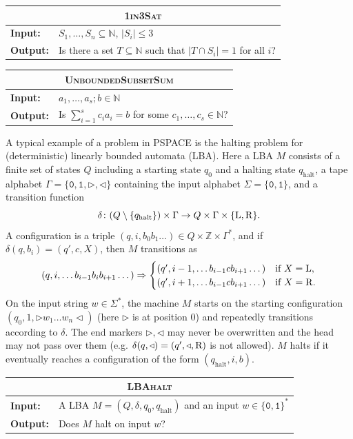 \documentclass[12pt]{article}
\newcommand{\NN}{\mathbb{N}}
\newcommand{\ZZ}{\mathbb{Z}}
\newcommand{\NULL}{\texttt{0}}
\newcommand{\EINS}{\texttt{1}}
\newcommand\problemBox[4][0.96\textwidth]{
\begin{tabularx}{#1}{lX}
\toprule
\multicolumn{2}{c}{#2} \\ \midrule
\textbf{Input:}    & #3  \\
\textbf{Output:} & #4  \\ \bottomrule
\end{tabularx}
}
\newcommand{\problemText}[1]{\textsc{#1}\xspace}
\newcommand{\OneInThreeSAT}{\problemText{1in3Sat}}
\newcommand{\SubsetSum}{\problemText{UnboundedSubsetSum}}
\newcommand{\LBAhalt}{\problemText{LBAhalt}}
\newcommand{\cclass}[1]{\textsf{\textup{#1}}\xspace}
\newcommand{\PSPACE}{\cclass{PSPACE}}
\begin{document}
  \begin{table}[H]
    \centering
    \problemBox[0.48\textwidth]{\OneInThreeSAT}
    {$S_1,\dots,S_n \subseteq \NN$, $|S_i| \leq 3$}
    {Is there a set $T \subseteq \NN$ such that $|T \cap S_i| = 1$ for all $i$?} 
    \problemBox[0.48\textwidth]{\SubsetSum}
    {$a_1,\dots,a_s;b \in \NN$}
    {Is $\sum_{i = 1}^s c_ia_i = b$ for some $c_1,\dots,c_s \in \NN$?}
  \end{table}

A typical example of a problem in \PSPACE is the halting problem for (deterministic) linearly bounded automata (LBA). Here a LBA $M$ consists of a finite set of states $Q$ including a starting state $q_0$ and a halting state $q_{\text{halt}}$, a tape alphabet $\Gamma = \{\NULL,\EINS,{\triangleright},{\triangleleft}\}$ containing the input alphabet $\Sigma = \{\NULL,\EINS\}$, and a transition function
\[
\delta \colon (Q\setminus\{q_{\text{halt}}\}) \times \Gamma \to Q \times \Gamma \times \{{\rm L},{\rm R}\}.
\]
A configuration is a triple $(q,i,b_0b_1\dots) \in Q \times \ZZ \times \Gamma^*$, and if $\delta(q,b_i) = (q',c,X)$, then $M$ transitions as
\[
(q,i,\dots b_{i-1}b_ib_{i+1} \dots ) \Rightarrow \begin{cases}
  (q',i-1, \dots b_{i-1}c b_{i+1} \dots) & \text{if }X = {\rm L},\\
  (q',i+1, \dots b_{i-1}c b_{i+1} \dots) & \text{if }X = {\rm R}. 
\end{cases} 
\]
On the input string $w \in \Sigma^*$, the machine $M$ starts on the starting configuration $(q_0,1,{\triangleright}w_1\dots w_n {\triangleleft})$ (here $\triangleright$ is at position $0$) and repeatedly transitions according to $\delta$. The end markers $\triangleright, \triangleleft$ may never be overwritten and the head may not pass over them (e.g. $\delta(q,{\triangleleft}) = (q',{\triangleleft},{\rm R})$ is not allowed). $M$ halts if it eventually reaches a configuration of the form $(q_{\text{halt}},i,b)$.

\begin{table}[H]
  \centering
  \problemBox[\textwidth]{\LBAhalt}
  {A LBA $M = (Q,\delta,q_0,q_{\text{halt}})$ and an input $w \in \{\NULL,\EINS\}^*$}
  {Does $M$ halt on input $w$?}
\end{table}
\end{document}
